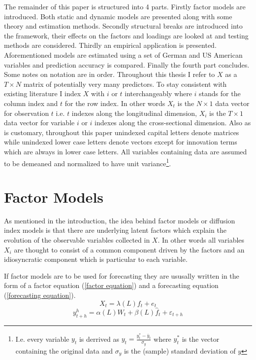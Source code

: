 \documentclass[12pt]{article}
\begin{document}
The remainder of this paper is structured into 4 parts. Firstly factor models are introduced. Both static and dynamic models are presented along with some theory and estimation methods. Secondly structural breaks are introduced into the framework, their effects on the factors and loadings are looked at and testing methods are considered. Thirdly an empirical application is presented. Aforementioned models are estimated using a set of German and US American variables and prediction accuracy is compared. Finally the fourth part concludes. \\

Some notes on notation are in order. Throughout this thesis I refer to $X$ as a $T \times N$ matrix of potentially very many predictors. To stay consistent with existing literature I index $X$ with $i$ or $t$ interchangeably where $i$ stands for the column index and $t$ for the row index. In other words $X_t$ is the $N \times 1$ data vector for observation $t$ i.e. $t$ indexes along the longitudinal dimension, $X_i$ is the $T \times 1$ data vector for variable $i$ or $i$ indexes along the cross-sectional dimension. Also as is customary, throughout this paper unindexed capital letters denote matrices while unindexed lower case letters denote vectors except for innovation terms which are always in lower case letters. All variables containing data are assumed to be demeaned and normalized to have unit variance\footnote{I.e. every variable $y_t$ is derrived as $y_t = \frac{y_t^* - \bar y_t}{\sigma_{y}}$ where $y_t^*$ is the vector containing the original data and $\sigma_{y}$ is the (sample) standard deviation of $y$}.

\section{Factor Models}
As mentioned in the introduction, the idea behind factor models or diffusion index models is that there are underlying latent factors which explain the evolution of the observable variables collected in $X$. In other words all variables $X_i$ are thought to consist of a common component driven by the factors and an idiosyncratic component which is particular to each variable.

If factor models are to be used for forecasting they are ususally written in the form of a factor equation (\ref{factor equation}) and a forecasting equation (\ref{forecasting equation}).
\begin{equation}
	\label{factor equation}
	X_t = \lambda(L) f_t + e_t
\end{equation}
\begin{equation}
	\label{forecasting equation}
	y^h_{t+h} = \alpha(L) W_t + \beta(L) \hat f_t + \varepsilon_{t+h}
\end{equation}
	
\end{document}
